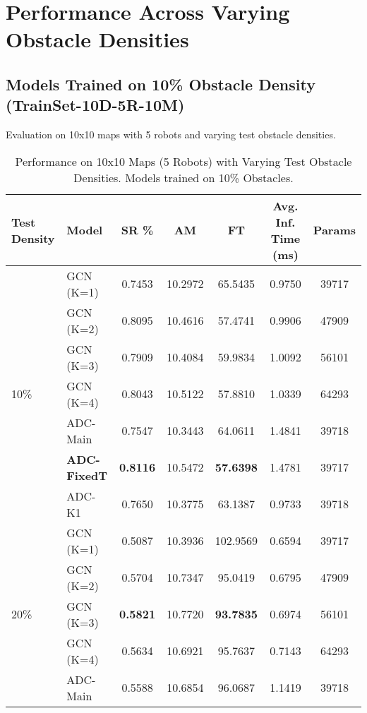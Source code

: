\section{Performance Across Varying Obstacle Densities}
\label{sec:perf_obstacle_density_detailed}

\subsection{Models Trained on 10\% Obstacle Density (TrainSet-10D-5R-10M)}
\label{subsec:perf_10D_train_detailed}
Evaluation on 10x10 maps with 5 robots and varying test obstacle densities.

\begin{table}[htbp]
    \centering
    \caption{Performance on 10x10 Maps (5 Robots) with Varying Test Obstacle Densities. Models trained on 10\% Obstacles.}
    \label{tab:density_perf_10D_train}
    \scriptsize %
    \begin{tabular}{llccccc}
        \toprule
        Test Density & Model & SR \% & AM & FT & Avg. Inf. Time (ms) & Params \\
        \midrule
        \multirow{7}{*}{10\%}
        & GCN (K=1) & 0.7453 & 10.2972 & 65.5435 & 0.9750 & 39717 \\
        & GCN (K=2) & 0.8095 & 10.4616 & 57.4741 & 0.9906 & 47909 \\
        & GCN (K=3) & 0.7909 & 10.4084 & 59.9834 & 1.0092 & 56101 \\
        & GCN (K=4) & 0.8043 & 10.5122 & 57.8810 & 1.0339 & 64293 \\
        & ADC-Main & 0.7547 & 10.3443 & 64.0611 & 1.4841 & 39718 \\
        & \textbf{ADC-FixedT} & \textbf{0.8116} & 10.5472 & \textbf{57.6398} & 1.4781 & 39717 \\
        & ADC-K1 & 0.7650 & 10.3775 & 63.1387 & 0.9733 & 39718 \\
        \midrule
        \multirow{7}{*}{20\%}
        & GCN (K=1) & 0.5087 & 10.3936 & 102.9569 & 0.6594 & 39717 \\
        & GCN (K=2) & 0.5704 & 10.7347 & 95.0419 & 0.6795 & 47909 \\
        & GCN (K=3) & \textbf{0.5821} & 10.7720 & \textbf{93.7835} & 0.6974 & 56101 \\
        & GCN (K=4) & 0.5634 & 10.6921 & 95.7637 & 0.7143 & 64293 \\
        & ADC-Main & 0.5588 & 10.6854 & 96.0687 & 1.1419 & 39718 \\

\end{tabular}
\end{table}
